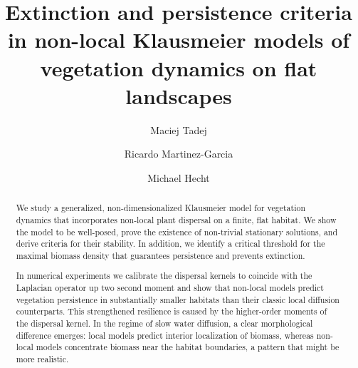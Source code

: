 \documentclass[preprint,12pt]{elsarticle}
\theoremstyle{plain}
\theoremstyle{definition}
\theoremstyle{remark}
\begin{document}
\begin{frontmatter}

\title{Extinction and persistence criteria in non-local Klausmeier models of vegetation dynamics on flat landscapes}






\author[aff1,aff3]{Maciej Tadej}

\author[aff1,aff2,aff4]{Ricardo Martinez-Garcia}

\author[aff1,aff3]{Michael Hecht}


\begin{abstract}
We study a generalized, non-dimensionalized Klausmeier model for vegetation dynamics that incorporates non-local plant dispersal on a finite, flat habitat. We show the model to be well-posed,  prove the existence of non-trivial stationary solutions, and derive criteria for their stability. In addition, we identify a critical threshold for the maximal biomass density that guarantees persistence and prevents extinction.

In numerical experiments we calibrate  the dispersal kernels to coincide with the Laplacian operator up two second moment and show that non-local models predict vegetation persistence in substantially smaller habitats than their classic local diffusion counterparts. This strengthened resilience is caused by the higher-order moments of the dispersal kernel. In the regime of slow water diffusion, a clear morphological difference emerges: local models predict interior localization of biomass, whereas non-local models concentrate biomass near the habitat boundaries, a pattern that might be more realistic.


\end{abstract}
\end{frontmatter}
\end{document}

